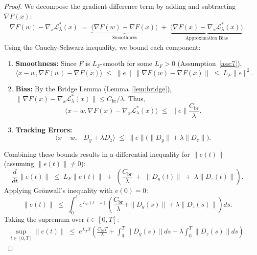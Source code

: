\documentclass{article}
\newcommand{\1}{\mathbf{1}}
\begin{document}
\begin{proof}
    We decompose the gradient difference term by adding and subtracting $\nabla F(x)$:
    \begin{align*}
        \nabla F(w) - \nabla_x \mathcal L_\lambda^*(x)
        \;=\; \underbrace{\bigl(\nabla F(w) - \nabla F(x)\bigr)}_{\text{Smoothness}}
        \;+\; \underbrace{\bigl(\nabla F(x) - \nabla_x \mathcal L_\lambda^*(x)\bigr)}_{\text{Approximation Bias}}.
    \end{align*}
    Using the Cauchy-Schwarz inequality, we bound each component:
    \begin{enumerate}[label=(\roman*)]
        \item \textbf{Smoothness:} Since $F$ is $L_F$-smooth for some $L_F>0$ (Assumption~\ref{ass:7}), 
        \[
        \langle x-w, \nabla F(w) - \nabla F(x) \rangle \;\le\; \|e\| \, \|\nabla F(w) - \nabla F(x)\| \;\le\; L_F \|e\|^2.
        \]
        \item \textbf{Bias:} By the Bridge Lemma (Lemma~\ref{lem:bridge}), $\|\nabla F(x) - \nabla_x \mathcal L_\lambda^*(x)\| \le C_{\mathrm{br}}/\lambda$. Thus,
        \[
        \langle x-w, \nabla F(x) - \nabla_x \mathcal L_\lambda^*(x) \rangle \;\le\; \|e\| \frac{C_{\mathrm{br}}}{\lambda}.
        \]
        \item \textbf{Tracking Errors:}
        \[
        \langle x-w, -D_y + \lambda D_z \rangle \;\le\; \|e\| \bigl( \|D_y\| + \lambda \|D_z\| \bigr).
        \]
    \end{enumerate}
    Combining these bounds results in a differential inequality for $\|e(t)\|$ (assuming $\|e(t)\|\neq 0$):
    \[
    \frac{d}{dt}\|e(t)\| \;\le\; L_F \|e(t)\| \;+\; \left( \frac{C_{\mathrm{br}}}{\lambda} \;+\; \|D_y(t)\| \;+\; \lambda \|D_z(t)\| \right).
    \]
    Applying Gr\"onwall's inequality with $e(0)=0$:
    \begin{equation}\label{eq:gronwall-step}
        \|e(t)\| \;\le\; \int_0^t e^{L_F(t-s)} \left( \frac{C_{\mathrm{br}}}{\lambda} + \|D_y(s)\| + \lambda \|D_z(s)\| \right) ds.
    \end{equation}
    Taking the supremum over $t \in [0, T]$:
    \begin{align}\label{eq:sup-bound-raw}
        \sup_{t\in[0,T]} \|e(t)\|
        \;\le\; e^{L_F T} \left( \frac{C_{\mathrm{br}} T}{\lambda} + \int_0^T \|D_y(s)\| ds + \lambda \int_0^T \|D_z(s)\| ds \right).
    \end{align}
    

\end{proof}
\end{document}
